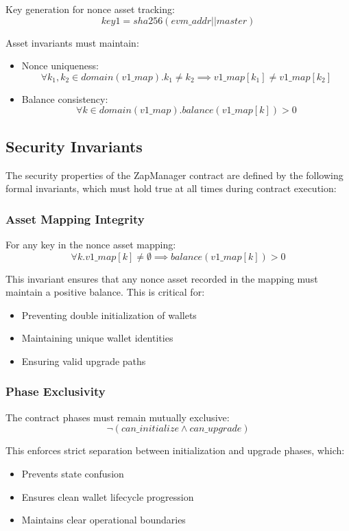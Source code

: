Key generation for nonce asset tracking:
\[ key1 = sha256(evm\_addr || master) \]

Asset invariants must maintain:
\begin{itemize}
    \item Nonce uniqueness:
        \[ \forall k_1,k_2 \in domain(v1\_map). k_1 \neq k_2 \implies v1\_map[k_1] \neq v1\_map[k_2] \]
    \item Balance consistency:
        \[ \forall k \in domain(v1\_map). balance(v1\_map[k]) > 0 \]
\end{itemize}


\subsection{Security Invariants}

The security properties of the ZapManager contract are defined by the following formal invariants, which must hold true at all times during contract execution:

\subsubsection{Asset Mapping Integrity}
For any key in the nonce asset mapping:
\[ \forall k. v1\_map[k] \neq \emptyset \implies balance(v1\_map[k]) > 0 \]

This invariant ensures that any nonce asset recorded in the mapping must maintain a positive balance. This is critical for:
\begin{itemize}
   \item Preventing double initialization of wallets
   \item Maintaining unique wallet identities
   \item Ensuring valid upgrade paths
\end{itemize}

\subsubsection{Phase Exclusivity}
The contract phases must remain mutually exclusive:
\[ \neg(can\_initialize \land can\_upgrade) \]

This enforces strict separation between initialization and upgrade phases, which:
\begin{itemize}
   \item Prevents state confusion
   \item Ensures clean wallet lifecycle progression
   \item Maintains clear operational boundaries
\end{itemize}

